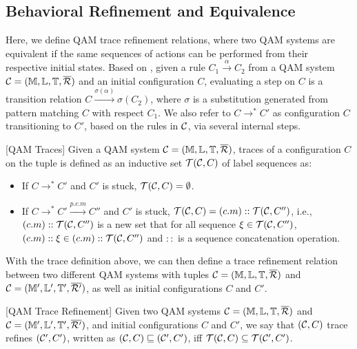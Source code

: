 \subsection{Behavioral Refinement and Equivalence} \label{sec:refinement}

Here, we define QAM trace refinement relations, where two QAM systems are equivalent if the same sequences of actions can be performed
from their respective initial states.
Based on ,
given a rule $C_1 \xrightarrow{\alpha} C_2$ from a QAM system $\mathcal{C}=(\mathbb{M},\mathbb{L},\mathbb{T},\overline{\mathcal{R}})$ and an initial configuration $C$,
evaluating a step on $C$ is a transition relation $C \xrightarrow{\sigma(\alpha)} \sigma(C_2)$, where $\sigma$ is a substitution generated from pattern matching $C$ with respect $C_1$.
We also refer to $C \longrightarrow^* C'$ as configuration $C$ transitioning to $C'$, based on the rules in $\mathcal{C}$, via several internal steps.

\begin{definition}\label{def:traces}\rm[QAM Traces]
Given a QAM system $\mathcal{C}=(\mathbb{M},\mathbb{L},\mathbb{T},\overline{\mathcal{R}})$, traces of a configuration $C$ on the tuple is defined as an inductive set $\mathcal{T}(\mathcal{C},C)$ of label sequences as:

\begin{itemize}
\item If $C \longrightarrow^* C'$ and $C'$ is stuck, $\mathcal{T}(\mathcal{C},C)=\emptyset$.
\item If $C \longrightarrow^* C' \xrightarrow{p.c.m} C''$ and $C'$ is stuck, $\mathcal{T}(\mathcal{C},C)=(c.m)::\mathcal{T}(\mathcal{C},C'')$, i.e., $(c.m)::\mathcal{T}(\mathcal{C},C'')$ is a new set that for all sequence $\xi \in \mathcal{T}(\mathcal{C},C'')$, $(c.m)::\xi \in (c.m)::\mathcal{T}(\mathcal{C},C'')$ and $::$ is a sequence concatenation operation.
\end{itemize}
\end{definition}

With the trace definition above, we can then define a trace refinement relation between two different QAM systems with tuples $\mathcal{C}=(\mathbb{M},\mathbb{L},\mathbb{T},\overline{\mathcal{R}})$ and $\mathcal{C}=(\mathbb{M}',\mathbb{L}',\mathbb{T}',\overline{\mathcal{R}'})$, as well as initial configurations $C$ and $C'$.

\begin{definition}\label{def:traceeq}\rm[QAM Trace Refinement]
Given two QAM systems $\mathcal{C}=(\mathbb{M},\mathbb{L},\mathbb{T},\overline{\mathcal{R}})$ and $\mathcal{C}=(\mathbb{M}',\mathbb{L}',\mathbb{T}',\overline{\mathcal{R}'})$, and initial configurations $C$ and $C'$,  we say that $(\mathcal{C},C)$ trace refines $(\mathcal{C}',C')$, written as $(\mathcal{C},C) \sqsubseteq (\mathcal{C}',C')$, iff $\mathcal{T}(\mathcal{C},C)\subseteq \mathcal{T}(\mathcal{C}',C')$.

\end{definition}

